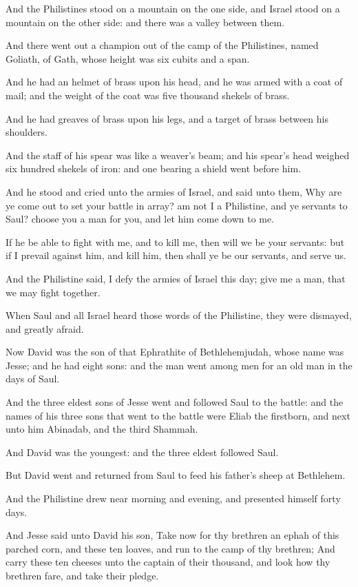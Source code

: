\Verse And the Philistines stood on a mountain on the one side, and Israel stood on a mountain on the other side: and there was a valley between them.

\Verse And there went out a champion out of the camp of the Philistines, named Goliath, of Gath, whose height was six cubits and a span.

\Verse And he had an helmet of brass upon his head, and he was armed with a coat of mail; and the weight of the coat was five thousand shekels of brass.

\Verse And he had greaves of brass upon his legs, and a target of brass between his shoulders.

\Verse And the staff of his spear was like a weaver's beam; and his spear's head weighed six hundred shekels of iron: and one bearing a shield went before him.

\Verse And he stood and cried unto the armies of Israel, and said unto them, Why are ye come out to set your battle in array? am not I a Philistine, and ye servants to Saul? choose you a man for you, and let him come down to me.

\Verse If he be able to fight with me, and to kill me, then will we be your servants: but if I prevail against him, and kill him, then shall ye be our servants, and serve us.

\Verse And the Philistine said, I defy the armies of Israel this day; give me a man, that we may fight together.

\Verse When Saul and all Israel heard those words of the Philistine, they were dismayed, and greatly afraid.

\Verse Now David was the son of that Ephrathite of Bethlehemjudah, whose name was Jesse; and he had eight sons: and the man went among men for an old man in the days of Saul.

\Verse And the three eldest sons of Jesse went and followed Saul to the battle: and the names of his three sons that went to the battle were Eliab the firstborn, and next unto him Abinadab, and the third Shammah.

\Verse And David was the youngest: and the three eldest followed Saul.

\Verse But David went and returned from Saul to feed his father's sheep at Bethlehem.

\Verse And the Philistine drew near morning and evening, and presented himself forty days.

\Verse And Jesse said unto David his son, Take now for thy brethren an ephah of this parched corn, and these ten loaves, and run to the camp of thy brethren; \Verse And carry these ten cheeses unto the captain of their thousand, and look how thy brethren fare, and take their pledge.

